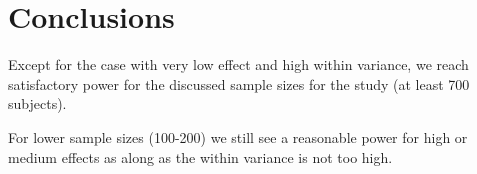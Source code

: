\documentclass[]{article}
\begin{document}
\section{Conclusions}\label{conclusions}

Except for the case with very low effect and high within variance, we
reach satisfactory power for the discussed sample sizes for the study
(at least 700 subjects).

For lower sample sizes (100-200) we still see a reasonable power for
high or medium effects as along as the within variance is not too high.
\end{document}
